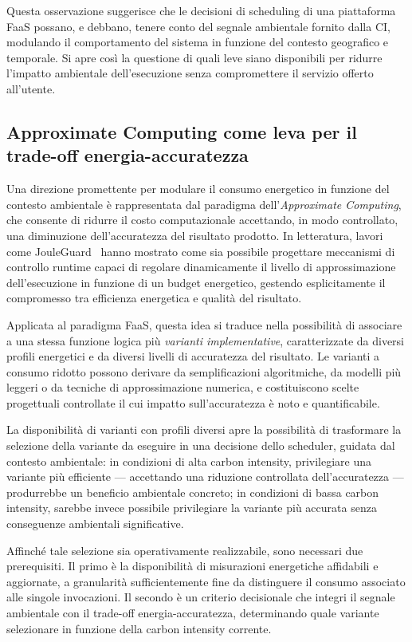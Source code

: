 Questa osservazione suggerisce che le decisioni di scheduling di una piattaforma FaaS
possano, e debbano, tenere conto del segnale ambientale fornito dalla CI,
modulando il comportamento del sistema in funzione del contesto geografico e
temporale.
Si apre così la questione di quali leve siano disponibili per ridurre l'impatto
ambientale dell'esecuzione senza compromettere il servizio offerto all'utente.

\subsection{Approximate Computing come leva per il trade-off energia-accuratezza}

Una direzione promettente per modulare il consumo energetico in funzione del contesto
ambientale è rappresentata dal paradigma dell'\emph{Approximate Computing}, che
consente di ridurre il costo computazionale accettando, in modo controllato, una
diminuzione dell'accuratezza del risultato prodotto.
In letteratura, lavori come JouleGuard~\cite{jouleguard} hanno mostrato come sia
possibile progettare meccanismi di controllo runtime capaci di regolare dinamicamente
il livello di approssimazione dell'esecuzione in funzione di un budget energetico,
gestendo esplicitamente il compromesso tra efficienza energetica e qualità del risultato.

Applicata al paradigma FaaS, questa idea si traduce nella possibilità di associare a
una stessa funzione logica più \emph{varianti implementative}, caratterizzate da
diversi profili energetici e da diversi livelli di accuratezza del risultato.
Le varianti a consumo ridotto possono derivare da semplificazioni algoritmiche,
da modelli più leggeri o da tecniche di approssimazione numerica, e costituiscono
scelte progettuali controllate il cui impatto sull'accuratezza è noto e quantificabile.

La disponibilità di varianti con profili diversi apre la possibilità di trasformare la
selezione della variante da eseguire in una decisione dello scheduler, guidata dal
contesto ambientale: in condizioni di alta carbon intensity, 
privilegiare una variante più efficiente — accettando una riduzione 
controllata dell'accuratezza — produrrebbe un beneficio ambientale concreto; 
in condizioni di bassa carbon intensity, 
sarebbe invece possibile privilegiare la variante più accurata senza
conseguenze ambientali significative.

Affinché tale selezione sia operativamente realizzabile, sono necessari due prerequisiti.
Il primo è la disponibilità di misurazioni energetiche affidabili e aggiornate, a
granularità sufficientemente fine da distinguere il consumo associato alle singole
invocazioni.
Il secondo è un criterio decisionale che integri il segnale ambientale con il trade-off
energia-accuratezza, determinando quale variante selezionare in funzione della carbon
intensity corrente.

